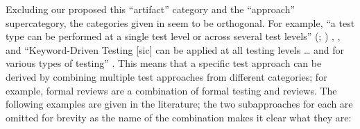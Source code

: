 \fi
Excluding \ifnotpaper our proposed \else this \fi ``artifact'' category and the
``approach'' supercategory, the categories given in  seem to
be orthogonal. For example, ``a test type can be performed at a single test
level or across several test levels''
\ifnotpaper
    (\citealp[p.~15]{IEEE2022}; \citeyear[p.~7]{IEEE2021})%
\else
    \cite[p.~15]{IEEE2022}, \cite[p.~7]{IEEE2021}%
\fi, and ``Keyword-Driven Testing [sic] can be applied at all testing levels
\dots{} and for various types of testing'' \citeyearpar[p.~4]{IEEE2016}.
This means that a specific test approach can be derived by combining multiple
test approaches from different categories; for example, formal reviews are a
combination of formal testing and reviews. \ifnotpaper The following examples
    are given in the literature; the two subapproaches for each are omitted
    for brevity as the name of the combination makes it clear what they are:


